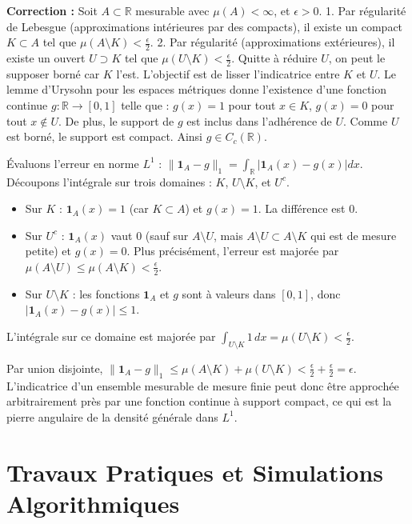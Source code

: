 \documentclass[11pt,a4paper]{article}
\begin{document}
\textbf{Correction :}
Soit $A \subset \mathbb{R}$ mesurable avec $\mu(A) < \infty$, et $\epsilon > 0$.
1. Par régularité de Lebesgue (approximations intérieures par des compacts), il existe un compact $K \subset A$ tel que $\mu(A \setminus K) < \frac{\epsilon}{2}$.
2. Par régularité (approximations extérieures), il existe un ouvert $U \supset K$ tel que $\mu(U \setminus K) < \frac{\epsilon}{2}$. Quitte à réduire $U$, on peut le supposer borné car $K$ l'est.
L'objectif est de lisser l'indicatrice entre $K$ et $U$.
Le lemme d'Urysohn pour les espaces métriques donne l'existence d'une fonction continue $g : \mathbb{R} \to [0,1]$ telle que :
$g(x) = 1$ pour tout $x \in K$,
$g(x) = 0$ pour tout $x \notin U$.
De plus, le support de $g$ est inclus dans l'adhérence de $U$. Comme $U$ est borné, le support est compact. Ainsi $g \in C_c(\mathbb{R})$.

Évaluons l'erreur en norme $L^1$ : $\| \mathbf{1}_A - g \|_1 = \int_{\mathbb{R}} |\mathbf{1}_A(x) - g(x)| dx$.
Découpons l'intégrale sur trois domaines : $K$, $U \setminus K$, et $U^c$.
\begin{itemize}
\item Sur $K$ : $\mathbf{1}_A(x) = 1$ (car $K \subset A$) et $g(x) = 1$. La différence est $0$.

\item Sur $U^c$ : $\mathbf{1}_A(x)$ vaut $0$ (sauf sur $A \setminus U$, mais $A \setminus U \subset A \setminus K$ qui est de mesure petite) et $g(x) = 0$. Plus précisément, l'erreur est majorée par $\mu(A \setminus U) \le \mu(A \setminus K) < \frac{\epsilon}{2}$.

\item Sur $U \setminus K$ : les fonctions $\mathbf{1}_A$ et $g$ sont à valeurs dans $[0,1]$, donc $|\mathbf{1}_A(x) - g(x)| \le 1$.
\end{itemize}
L'intégrale sur ce domaine est majorée par $\int_{U \setminus K} 1 \, dx = \mu(U \setminus K) < \frac{\epsilon}{2}$.

Par union disjointe, $\| \mathbf{1}_A - g \|_1 \le \mu(A \setminus K) + \mu(U \setminus K) < \frac{\epsilon}{2} + \frac{\epsilon}{2} = \epsilon$.
L'indicatrice d'un ensemble mesurable de mesure finie peut donc être approchée arbitrairement près par une fonction continue à support compact, ce qui est la pierre angulaire de la densité générale dans $L^1$.




\newpage
\part{Travaux Pratiques et Simulations Algorithmiques}
\end{document}
